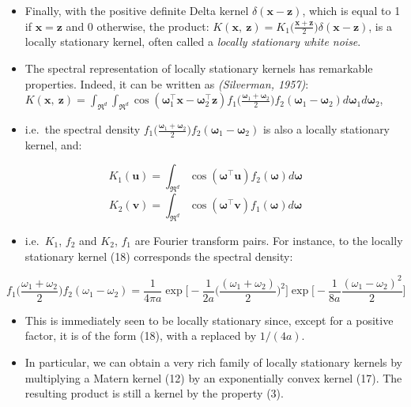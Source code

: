 \documentclass[
  ignorenonframetext,
]{beamer}
\providecommand{\tightlist}{%
  \setlength{\itemsep}{0pt}\setlength{\parskip}{0pt}}
\begin{document}
\begin{frame}{}
\protect\hypertarget{section-14}{}
\begin{itemize}
\item
  Finally, with the positive definite Delta kernel
  \(\delta(\pmb x - \pmb z)\), which is equal to 1 if
  \(\pmb x = \pmb z\) and 0 otherwise, the product:
  \(K(\pmb x,\ \pmb z) = K_1\Big(\frac {\pmb x + \pmb z} 2\Big) \delta(\pmb x - \pmb z)\),
  is a locally stationary kernel, often called a \emph{locally
  stationary white noise}.
\item
  The spectral representation of locally stationary kernels has
  remarkable properties. Indeed, it can be written as \emph{(Silverman,
  1957)}:
  \(K(\pmb x,\ \pmb z) = \int_{\mathfrak R^d} \int_{\mathfrak R^d} \cos(\pmb \omega^{\top}_1 \pmb x - \pmb\omega ^{\top}_2 \pmb z) f_1\big(\frac {\pmb\omega_1+\pmb\omega_2} 2\big) f_2(\pmb\omega_1-\pmb\omega_2)d\pmb\omega_1d\pmb\omega_2\),
\item
  i.e.~the spectral density
  \(f_1\big(\frac{\pmb\omega_1+\pmb\omega_2}{2}\big)f_2(\pmb\omega_1-\pmb\omega_2)\)
  is also a locally stationary kernel, and:
\end{itemize}

\[
K_1(\pmb u)=\int_{\mathfrak R^d}\cos(\pmb\omega^{\top}\pmb u)f_2(\pmb\omega)d\pmb\omega
\] \vspace{5mm} \[
K_2(\pmb v)=\int_{\mathfrak R^d}\cos(\pmb\omega^{\top}\pmb v)f_1(\pmb\omega)d\pmb\omega
\]
\end{frame}

\begin{frame}{}
\protect\hypertarget{section-15}{}
\begin{itemize}
\tightlist
\item
  i.e.~\(K_1\), \(f_2\) and \(K_2\), \(f_1\) are Fourier transform
  pairs. For instance, to the locally stationary kernel (18) corresponds
  the spectral density:
\end{itemize}

\tiny

\[
f_1\big(\frac{\omega_1 + \omega_2}{2}\big)f_2(\omega_1 - \omega_2)={\frac 1 {4\pi a}}\exp \Big[-\frac 1{2a}\big(\frac {(\omega_1 + \omega_2)} 2\big)^2\Big] \exp\Big[-\frac 1{8a} \frac {(\omega_1 - \omega_2)^2}2\Big]
\]

\normalsize

\begin{itemize}
\item
  This is immediately seen to be locally stationary since, except for a
  positive factor, it is of the form (18), with a replaced by
  \(1/(4a)\).
\item
  In particular, we can obtain a very rich family of locally stationary
  kernels by multiplying a Matern kernel (12) by an exponentially convex
  kernel (17). The resulting product is still a kernel by the property
  (3).
\end{itemize}
\end{frame}
\end{document}
